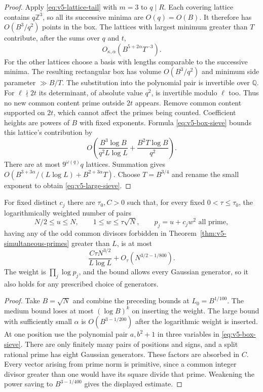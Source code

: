 \begin{proof}
Apply \eqref{eq:v5-lattice-tail} with $m=3$ to $q\mid R$.
Each covering lattice contains $q\mathbb Z^3$, so all its successive minima
are $O(q)=O(B)$. It therefore has $O(B^3/q^2)$ points in the box.
The lattices with largest minimum greater than $T$ contribute, after the
sums over $q$ and $t$,
\[
 O_{\kappa,\alpha}(B^{5+2\alpha}T^{-3}).
\]
For the other lattices choose a basis with lengths comparable to the
successive minima. The resulting rectangular box has volume $O(B^3/q^2)$
and minimum side parameter $\gg B/T$.
The substitution into the polynomial pair is invertible over $\mathbb Q$.
For $\ell\nmid2t$ its determinant, of absolute value $q^2$, is invertible
modulo $\ell$ too. Thus no new common content prime outside $2t$ appears.
Remove common content supported on $2t$, which cannot affect the primes
being counted. Coefficient heights are powers of $B$ with fixed exponents.
Formula \eqref{eq:v5-box-sieve} bounds this lattice's contribution by
\[
 O\left(\frac{B^3\log B}{q^2L\log L}
                 +\frac{B^2T\log B}{q^2}\right).
\]
There are at most $9^{\omega(q)}q$ lattices. Summation gives
$O(B^{3+3\alpha}/(L\log L)+B^{2+3\alpha}T)$.
Choose $T=B^{3/4}$ and rename the small exponent to obtain
\eqref{eq:v5-large-sieve}.
\end{proof}

\begin{proposition}\label{prop:v5-obstruction-tail}
For fixed distinct $c_j$ there are $\tau_0,C>0$ such that, for every fixed
$0<\tau\leq\tau_0$, the logarithmically weighted number of pairs
\[
 N/2\leq u\leq N,\qquad 1\leq w\leq\tau\sqrt N,
 \qquad p_j=u+c_jw^2\text{ all prime},
\]
having any of the odd common divisors forbidden in
Theorem~\ref{thm:v5-simultaneous-primes} greater than $L$, is at most
\begin{equation}\label{eq:v5-obstruction-tail}
 \frac{C\tau N^{3/2}}{L\log L}
       +O_\tau(N^{3/2-1/800}).
\end{equation}
The weight is $\prod_j\log p_j$, and the bound allows every Gaussian
generator, so it also holds for any prescribed choice of generators.
\end{proposition}
\begin{proof}
Take $B=\sqrt N$ and combine the preceding bounds at $L_0=B^{1/100}$.
The medium bound loses at most $(\log B)^k$ on inserting the weight.
The large bound with sufficiently small $\alpha$ is
$O(B^{3-1/200})$ after the logarithmic weight is inserted.
At one position use the polynomial pair $a,b^2+1$ in three variables
in \eqref{eq:v5-box-sieve}.
There are only finitely many pairs of positions and signs, and a split
rational prime has eight Gaussian generators. These factors are absorbed
in $C$. Every vector arising from prime norm is primitive, since a common
integer divisor greater than one would have its square divide that prime.
Weakening the power saving to $B^{3-1/400}$ gives the displayed estimate.
\end{proof}
